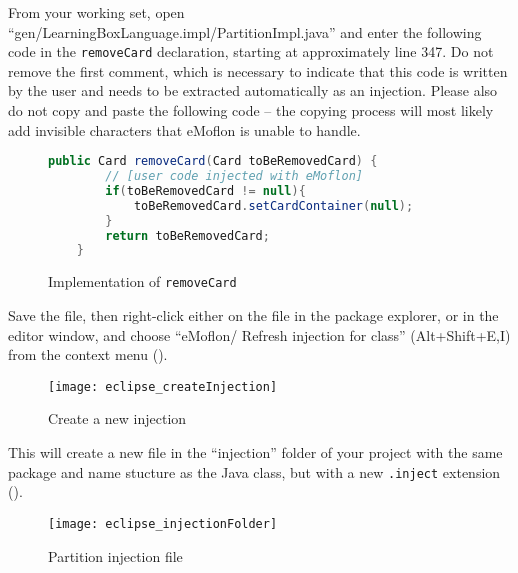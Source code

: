 \begin{stepbystep}

\item From your working set, open ``gen/LearningBoxLanguage.impl/Part\-it\-ionImpl.java'' and enter the following code in the
\texttt{removeCard} declaration, starting at approximately line 347. Do not remove the first comment, which is necessary to indicate that this code is written
by the user and needs to be extracted automatically as an injection. Please also do not copy and paste the following code -- the copying process will most
likely add invisible characters that eMoflon is unable to handle.

\vspace{0.5cm}

\begin{figure}[htbp]
        \centering
        \begin{lstlisting}[language=Java, keywordstyle={\bfseries\color{purple}}, backgroundcolor=\color{white}]
    public Card removeCard(Card toBeRemovedCard) {
		// [user code injected with eMoflon]
		if(toBeRemovedCard != null){
			toBeRemovedCard.setCardContainer(null);
		}
		return toBeRemovedCard;
	}
        \end{lstlisting}
        \caption{Implementation of \texttt{removeCard}}
        \label{code:addToStringRep_impl}
\end{figure}

\vspace{0.5cm}

\item Save the file, then right-click either on the file in the package explorer, or in the editor window, and choose ``eMoflon/
Refresh injection for class'' (Alt+Shift+E,I) from the context menu ().

\begin{figure}[htbp]
    \centering
    \texttt{[image: eclipse\_createInjection]}
    \caption{Create a new injection}
    \label{eclipse:injection_create_injection}
\end{figure}

\item This will create a new file in the ``injection'' folder of your project with the same package and name stucture as the Java class,
but with a new \texttt{.inject} extension ().

\begin{figure}[htbp]
    \centering
    \texttt{[image: eclipse\_injectionFolder]}
    \caption{Partition injection file}
    \label{eclipse:injection_folder}
\end{figure}


\end{stepbystep}
